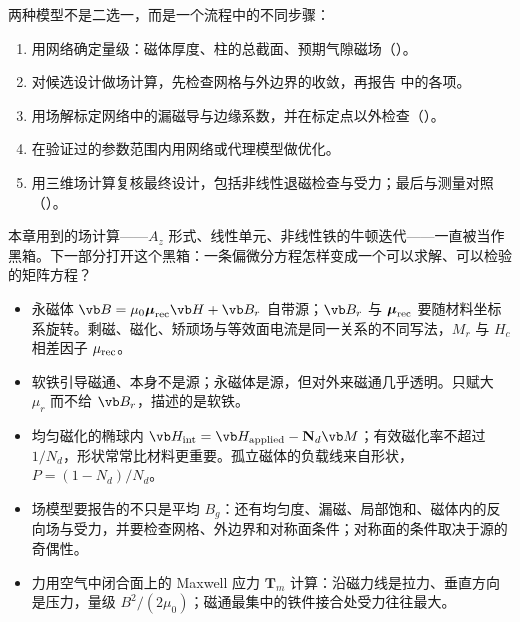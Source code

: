 两种模型不是二选一，而是一个流程中的不同步骤：
\begin{enumerate}
\item 用网络确定量级：磁体厚度、柱的总截面、预期气隙磁场（）。
\item 对候选设计做场计算，先检查网格与外边界的收敛，再报告 中的各项。
\item 用场解标定网络中的漏磁导与边缘系数，并在标定点以外检查（）。
\item 在验证过的参数范围内用网络或代理模型做优化。
\item 用三维场计算复核最终设计，包括非线性退磁检查与受力；最后与测量对照（）。
\end{enumerate}

本章用到的场计算——$A_z$ 形式、线性单元、非线性铁的牛顿迭代——一直被当作黑箱。下一部分打开这个黑箱：一条偏微分方程怎样变成一个可以求解、可以检验的矩阵方程？

\begin{takeaways}
\begin{itemize}
\item 永磁体 $\vb B=\mu_0\boldsymbol\mu_{\rm rec}\vb H+\vb B_r$ 自带源；$\vb B_r$ 与 $\boldsymbol\mu_{\rm rec}$ 要随材料坐标系旋转。剩磁、磁化、矫顽场与等效面电流是同一关系的不同写法，$M_r$ 与 $H_c$ 相差因子 $\mu_{\rm rec}$。
\item 软铁引导磁通、本身不是源；永磁体是源，但对外来磁通几乎透明。只赋大 $\mu_r$ 而不给 $\vb B_r$，描述的是软铁。
\item 均匀磁化的椭球内 $\vb H_{\rm int}=\vb H_{\rm applied}-\mathbf N_d\vb M$；有效磁化率不超过 $1/N_d$，形状常常比材料更重要。孤立磁体的负载线来自形状，$P=(1-N_d)/N_d$。
\item 场模型要报告的不只是平均 $B_g$：还有均匀度、漏磁、局部饱和、磁体内的反向场与受力，并要检查网格、外边界和对称面条件；对称面的条件取决于源的奇偶性。
\item 力用空气中闭合面上的 Maxwell 应力 $\mathbf T_m$ 计算：沿磁力线是拉力、垂直方向是压力，量级 $B^2/(2\mu_0)$；磁通最集中的铁件接合处受力往往最大。
\end{itemize}
\end{takeaways}

